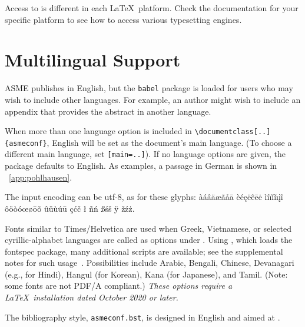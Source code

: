 \documentclass[captionpatch,colorlinks,upint,subscriptcorrection,varvw,german]{asmeconf}
\begin{document}
Access to  is different in each \LaTeX\ platform.  Check the documentation for your specific platform to see how to access various typesetting engines.

\section{Multilingual Support}\label{appendix:c}

ASME publishes in English, but the \texttt{babel} package is loaded for 
users who may wish to include other languages. For example, an author might wish to include an appendix that provides the 
abstract in another language.

When more than one language option is included in \verb|\documentclass[..]{asmeconf}|, English will be 
set as the document's main language. (To choose a different main language, set \texttt{[main=..]}).
If no language options are given, the package defaults to English.  As examples, a passage in German is 
shown in  \appendixname~\ref{app:pohlhausen}.

The input encoding can be utf-8, as for these glyphs:
%
àáâäæãåā èéęëêēė ìíïǐĩıįî ôöòóœøōõ ûüùúū çćč ł ñń ßśš ÿ žźż.

Fonts similar to Times/Helvetica are used when Greek, Vietnamese, or selected cyrillic-alphabet languages are called as options under {\upshape{}}. Using {\upshape{}}, which loads the fontspec package, many additional scripts are available; see the supplemental notes for such usage~\cite{lienhard2021}. Possibilities include Arabic, Bengali, Chinese, Devanagari (e.g., for Hindi), Hangul (for Korean), Kana (for Japanese), and Tamil. (Note: some fonts are not PDF/A compliant.) \textit{These options require a \LaTeX\ installation dated October 2020 or later.}

The bibliography style, \texttt{asmeconf.bst}, is designed in English and aimed at .  

\end{document}
